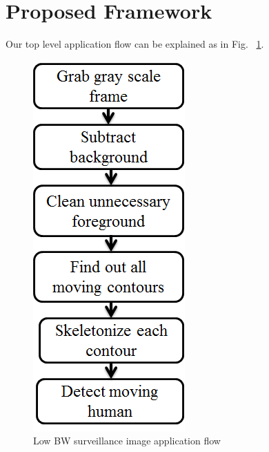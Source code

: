 \documentclass[conference]{IEEEtran}
\begin{document}
\section{Proposed Framework}
Our top level application flow can be explained as in Fig. ~\ref{image_pipeline}.
\begin{figure}[!h]
\centering
\includegraphics[scale=0.45]{figures/image_pipeline}
\caption{Low BW surveillance image application flow}
\label{image_pipeline}
\end{figure}
\end{document}
